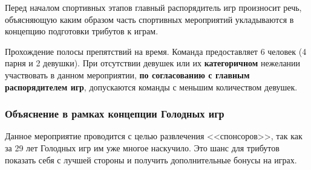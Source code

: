 
\par Перед началом спортивных этапов главный распорядитель игр произносит речь, объясняющую каким образом часть спортивных мероприятий укладываются в концепцию подготовки трибутов к играм.


\par Прохождение полосы препятствий на время. Команда предоставляет 6 человек (4 парня и 2 девушки). При отсутствии девушек или их \textbf{категоричном} нежелании участвовать в данном мероприятии, \textbf{по согласованию с главным распорядителем игр}, допускаются команды с меньшим количеством девушек.






\subsubsection*{Объяснение в рамках концепции Голодных игр}
\par Данное мероприятие проводится с целью развлечения <<спонсоров>>, так как за 29 лет Голодных игр им уже многое наскучило. Это шанс для трибутов показать себя с лучшей стороны и получить дополнительные бонусы на играх.





